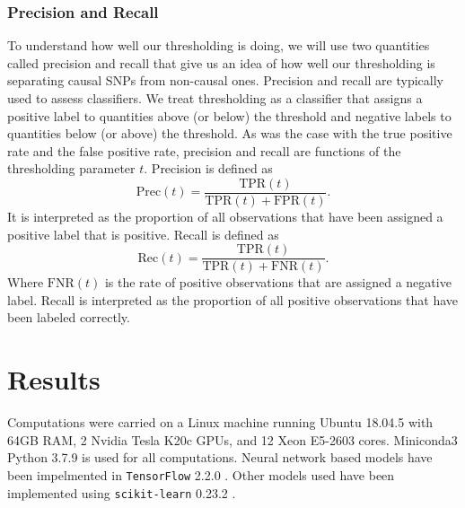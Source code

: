 \documentclass{article}
\begin{document}
\subsubsection{Precision and Recall}
To understand how well our thresholding is doing, we will use two quantities called precision and recall that give us an idea of how well our thresholding is separating causal SNPs from non-causal ones. Precision and recall are typically used to assess classifiers. We treat thresholding as a classifier that assigns a positive label to quantities above (or below) the threshold and negative labels to quantities below (or above) the threshold. As was the case with the true positive rate and the false positive rate, precision and recall are functions of the thresholding parameter $t.$ Precision is defined as 
\[
    \mathrm{Prec}(t) = \frac{\mathrm{TPR}(t)}{\mathrm{TPR}(t) + \mathrm{FPR}(t)}.
\]
It is interpreted as the proportion of all observations that have been assigned a positive label that is positive. Recall is defined as 
\[
    \mathrm{Rec}(t) = \frac{\mathrm{TPR}(t)}{\mathrm{TPR}(t) + \mathrm{FNR}(t)}.
\]
Where $\mathrm{FNR}(t)$ is the rate of positive observations that are assigned a negative label. Recall is interpreted as the proportion of all positive observations that have been labeled correctly. 
\section{Results}
Computations were carried on a Linux machine running Ubuntu 18.04.5 with 64GB RAM, 2 Nvidia Tesla K20c GPUs, and 12 Xeon E5-2603 cores. Miniconda3 Python 3.7.9 is used for all computations. Neural network based models have been impelmented in \texttt{TensorFlow} 2.2.0 \cite{tf}. Other models used have been implemented using \texttt{scikit-learn} 0.23.2 \cite{scikit-learn}.
\end{document}
